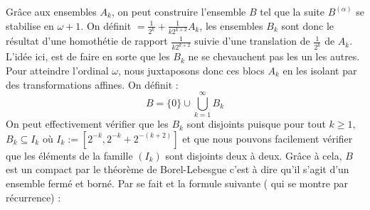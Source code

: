 \begin{center} %
\end{center}

Grâce aux ensembles $A_k$, on peut construire l'ensemble $B$ tel que la suite $B^{(\alpha)}$ se stabilise en $\omega+1$. On définit $ = \frac{1}{2^k}+ \frac{1}{k2^{k+2}}A_k$, les ensembles $B_k$ sont donc le résultat d'une homothétie de rapport $\frac{1}{k2^{k+2}}$ suivie d'une translation de $\frac{1}{2^k}$ de $A_k$. L'idée ici, est de faire en sorte que les $B_k$ ne se chevauchent pas les un les autres.
Pour atteindre l'ordinal $\omega$, nous juxtaposons donc ces blocs $A_k$ en les isolant par des transformations affines. On définit :
\[
B=\{0\}\cup \bigcup_{k=1}^{\infty}B_k
\]
On peut effectivement vérifier que les $B_k$ sont disjoints puisque pour tout $k\ge 1$, $B_k\subseteq I_k$ où $I_k := [2^{-k},2^{-k}+2^{-(k+2)}]$ et que nous pouvons facilement vérifier que les éléments de la famille $(I_k)$ sont disjoints deux à deux. Grâce à cela, $B$ est un compact par le théorème de Borel-Lebesgue c'est à dire qu'il s'agit d'un ensemble fermé et borné. Par se fait et la formule suivante ( qui se montre par récurrence) :

